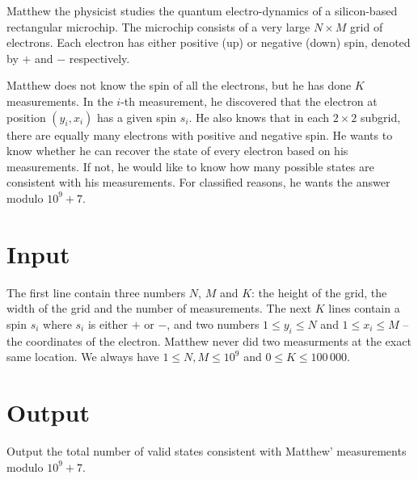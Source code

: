 
Matthew the physicist studies the quantum electro-dynamics of a silicon-based rectangular microchip. The microchip consists of a very large $N \times M$ grid of electrons. Each electron has either positive (up) or negative (down) spin, denoted by $+$ and $-$ respectively.

Matthew does not know the spin of all the electrons, but he has done $K$ measurements. In the $i$-th measurement, he discovered that the electron at position $(y_i, x_i)$ has a given spin $s_i$. He also knows that in each $2\times2$ subgrid, there are equally many electrons with positive and negative spin. He wants to know whether he can recover the state of every electron based on his measurements. If not, he would like to know how many possible states are consistent with his measurements. For classified reasons, he wants the answer modulo $10 ^ 9 + 7$.

\section*{Input}
The first line contain three numbers $N$, $M$ and $K$: the height of the grid, the width of the grid and the number of measurements. The next $K$ lines contain a spin $s_i$ where $s_i$ is either $+$ or $-$, and two numbers $1 \leq y_i \leq N$ and $1 \leq x_i \leq M$ -- the coordinates of the electron. Matthew never did two measurments at the exact same location.
%
We always have $1 \leq N, M \leq 10^9$ and $0 \leq K \leq 100\,000$. 

\section*{Output}
Output the total number of valid states consistent with Matthew' measurements modulo $10 ^ 9 + 7$.


